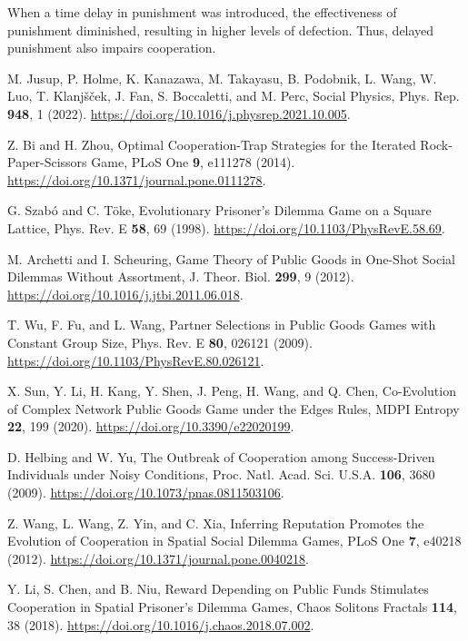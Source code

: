 When a time delay in punishment was introduced, the effectiveness of punishment diminished, resulting in higher levels of defection. Thus, delayed punishment also impairs cooperation. 





\begin{thebibliography}{04}


M. Jusup, P. Holme, K. Kanazawa, M. Takayasu, B. Podobnik, L. Wang, W. Luo, T. Klanjšček, J. Fan, S. Boccaletti, and M. Perc, Social Physics, Phys. Rep. \textbf{948}, 1 (2022). \url{https://doi.org/10.1016/j.physrep.2021.10.005}.

Z. Bi and H. Zhou, Optimal Cooperation-Trap Strategies for the Iterated Rock-Paper-Scissors Game, PLoS One \textbf{9}, e111278 (2014). \url{https://doi.org/10.1371/journal.pone.0111278}.

G. Szabó and C. Töke, Evolutionary Prisoner’s Dilemma Game on a Square Lattice, Phys. Rev. E \textbf{58}, 69 (1998). \url{https://doi.org/10.1103/PhysRevE.58.69}.

M. Archetti and I. Scheuring, Game Theory of Public Goods in One-Shot Social Dilemmas Without Assortment, J. Theor. Biol. \textbf{299}, 9 (2012). \url{https://doi.org/10.1016/j.jtbi.2011.06.018}.

T. Wu, F. Fu, and L. Wang, Partner Selections in Public Goods Games with Constant Group Size, Phys. Rev. E \textbf{80}, 026121 (2009). \url{https://doi.org/10.1103/PhysRevE.80.026121}.

X. Sun, Y. Li, H. Kang, Y. Shen, J. Peng, H. Wang, and Q. Chen, Co-Evolution of Complex Network Public Goods Game under the Edges Rules, MDPI Entropy \textbf{22}, 199 (2020). \url{https://doi.org/10.3390/e22020199}.

D. Helbing and W. Yu, The Outbreak of Cooperation among Success-Driven Individuals under Noisy Conditions, Proc. Natl. Acad. Sci. U.S.A. \textbf{106}, 3680 (2009). \url{https://doi.org/10.1073/pnas.0811503106}.

Z. Wang, L. Wang, Z. Yin, and C. Xia, Inferring Reputation Promotes the Evolution of Cooperation in Spatial Social Dilemma Games, PLoS One \textbf{7}, e40218 (2012). \url{https://doi.org/10.1371/journal.pone.0040218}.

Y. Li, S. Chen, and B. Niu, Reward Depending on Public Funds Stimulates Cooperation in Spatial Prisoner’s Dilemma Games, Chaos Solitons Fractals \textbf{114}, 38 (2018). \url{https://doi.org/10.1016/j.chaos.2018.07.002}.


\end{thebibliography}
